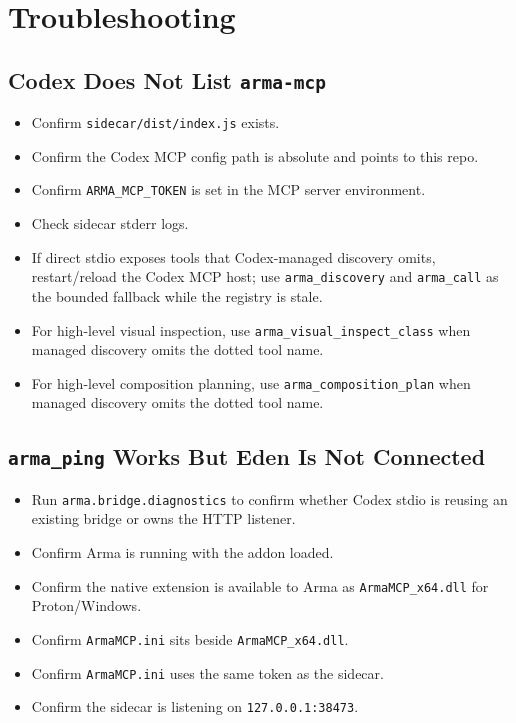\documentclass[11pt]{article}
\newcommand{\code}[1]{\texttt{#1}}
\begin{document}
\section{Troubleshooting}

\subsection{Codex Does Not List \code{arma-mcp}}

\begin{itemize}
  \item Confirm \code{sidecar/dist/index.js} exists.
  \item Confirm the Codex MCP config path is absolute and points to this repo.
  \item Confirm \code{ARMA\_MCP\_TOKEN} is set in the MCP server environment.
  \item Check sidecar stderr logs.
  \item If direct stdio exposes tools that Codex-managed discovery omits,
        restart/reload the Codex MCP host; use \code{arma\_discovery} and
        \code{arma\_call} as the bounded fallback while the registry is stale.
  \item For high-level visual inspection, use \code{arma\_visual\_inspect\_class}
        when managed discovery omits the dotted tool name.
  \item For high-level composition planning, use \code{arma\_composition\_plan}
        when managed discovery omits the dotted tool name.
\end{itemize}

\subsection{\code{arma\_ping} Works But Eden Is Not Connected}

\begin{itemize}
  \item Run \code{arma.bridge.diagnostics} to confirm whether Codex stdio is
        reusing an existing bridge or owns the HTTP listener.
  \item Confirm Arma is running with the addon loaded.
  \item Confirm the native extension is available to Arma as \code{ArmaMCP\_x64.dll}
        for Proton/Windows.
  \item Confirm \code{ArmaMCP.ini} sits beside \code{ArmaMCP\_x64.dll}.
  \item Confirm \code{ArmaMCP.ini} uses the same token as the sidecar.
  \item Confirm the sidecar is listening on \code{127.0.0.1:38473}.
\end{itemize}
\end{document}
